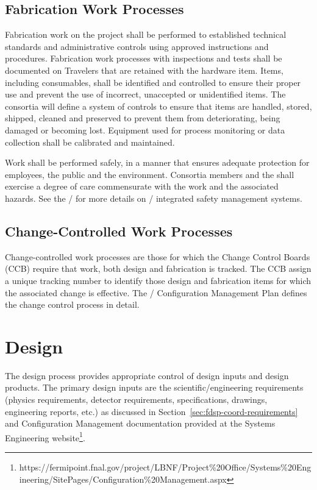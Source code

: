 \subsection{Fabrication Work Processes}

Fabrication work on the  project shall be performed to
established technical standards and administrative controls using
approved instructions and procedures. Fabrication work processes with
 inspections and tests shall be documented on Travelers that are
retained with the hardware item. Items, including consumables, shall
be identified and controlled to ensure their proper use and prevent
the use of incorrect, unaccepted or unidentified items. The consortia
will define a system of controls to ensure that items are handled,
stored, shipped, cleaned and preserved to prevent them from
deteriorating, being damaged or becoming lost. Equipment used for
process monitoring or data collection shall be calibrated and
maintained.

Work shall be performed safely, in a manner that ensures adequate
protection for employees, the public and the environment. Consortia
members and the   shall exercise a degree of
care commensurate with the work and the associated hazards. See the
/  for more details on
/ integrated safety management systems.

\subsection{Change-Controlled Work Processes}

Change-controlled work processes are those for which the 
Change Control Boards (CCB) require that work, both design and
fabrication is tracked. 
The CCB assign a unique tracking number to
identify those design and fabrication items for which the associated
change is effective. The / Configuration
Management Plan defines the change control process in detail.

\section{Design}

The  design process provides appropriate control of design
inputs and design products. The primary design inputs are the
 scientific/engineering requirements (physics
requirements, detector requirements, specifications, drawings,
engineering reports, etc.) as discussed in
Section~\ref{sec:fdsp-coord-requirements} and Configuration Management
documentation provided at the Systems Engineering
website\footnote{https://fermipoint.fnal.gov/project/LBNF/Project\%20Office/Systems\%20Engineering/SitePages/Configuration\%20Management.aspx}. 

